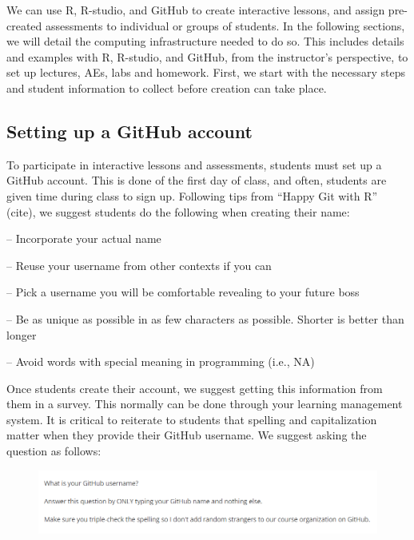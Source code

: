 \documentclass[
  12pt]{article}
\begin{document}
We can use R, R-studio, and GitHub to create interactive lessons, and
assign pre-created assessments to individual or groups of students. In
the following sections, we will detail the computing infrastructure
needed to do so. This includes details and examples with R, R-studio,
and GitHub, from the instructor's perspective, to set up lectures, AEs,
labs and homework. First, we start with the necessary steps and student
information to collect before creation can take place.

\hypertarget{setting-up-a-github-account}{%
\subsection{Setting up a GitHub
account}\label{setting-up-a-github-account}}

To participate in interactive lessons and assessments, students must set
up a GitHub account. This is done of the first day of class, and often,
students are given time during class to sign up. Following tips from
``Happy Git with R'' (cite), we suggest students do the following when
creating their name:

-- Incorporate your actual name

-- Reuse your username from other contexts if you can

-- Pick a username you will be comfortable revealing to your future boss

-- Be as unique as possible in as few characters as possible. Shorter is
better than longer

-- Avoid words with special meaning in programming (i.e., NA)

Once students create their account, we suggest getting this information
from them in a survey. This normally can be done through your learning
management system. It is critical to reiterate to students that spelling
and capitalization matter when they provide their GitHub username. We
suggest asking the question as follows:

\begin{figure}

{\centering \includegraphics{images/github.question.png}

}

\end{figure}
\end{document}

